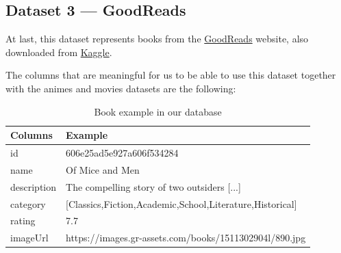 \documentclass[oneside]{article}
\newcommand*\fpar{\hspace{1ex}}
\begin{document}
  \subsection{Dataset 3 — GoodReads}
  \label{sec:books}
  \fpar At last, this dataset represents books from the \href{https://www.goodreads.com/}{GoodReads} website, also downloaded from \href{https://www.kaggle.com/meetnaren/goodreads-best-books}{Kaggle}.
  \par The columns that are meaningful for us to be able to use this dataset together with the animes and movies datasets are the following:
  \begin{table}[H]
    \centering
    \begin{tabular}{l|l}
      Columns & Example                       \\ \hline
      id      & 606e25ad5e927a606f534284      \\
      name    & Of Mice and Men               \\
      description & The compelling story of two outsiders [...]           \\
      category& [Classics,Fiction,Academic,School,Literature,Historical]  \\
      rating  & 7.7                           \\
      imageUrl& https://images.gr-assets.com/books/1511302904l/890.jpg
    \end{tabular}
    \caption{Book example in our database}
    \label{table:book}
  \end{table}
\end{document}

